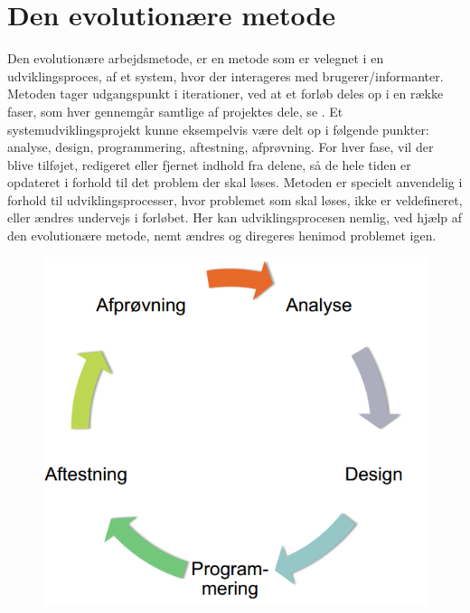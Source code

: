 \chapter{Den evolutionære metode}
\label{akademiskmetode}

Den evolutionære arbejdsmetode, er en metode som er velegnet i en udviklingsproces, af et system, hvor der interageres med brugerer/informanter. Metoden tager udgangspunkt i iterationer, ved at et forløb deles op i en række faser, som hver gennemgår samtlige af projektes dele, se . Et systemudviklingsprojekt kunne eksempelvis være delt op i følgende punkter: analyse, design, programmering, aftestning, afprøvning. For hver fase, vil der blive tilføjet, redigeret eller fjernet indhold fra delene, så de hele tiden er opdateret i forhold til det problem der skal løses. Metoden er specielt anvendelig i forhold til udviklingsprocesser, hvor problemet som skal løses, ikke er veldefineret, eller ændres undervejs i forløbet. Her kan udviklingsprocesen nemlig, ved hjælp af den evolutionære metode, nemt ændres og diregeres henimod problemet igen. 

\begin{figure}[ht]
		\centering
		\includegraphics[scale=0.5]{billeder/evolutionaeremetode.png}
  		\label{fig:evolutionaeremetode}
\end{figure}

